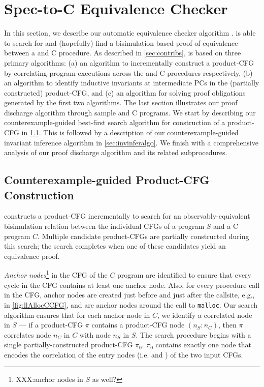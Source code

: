 \section{Spec-to-C Equivalence Checker}
\label{sec:spectocalgo}
In this section, we describe our automatic equivalence checker algorithm \toolName{}.
\toolName{} is able to search for and (hopefully) find a bisimulation based proof of equivalence
between a \SpecL{} and C procedure.
As described in \cref{sec:contribs}, \toolName{} is based on three primary algorithms:
(a) an algorithm to incrementally construct a product-CFG by correlating program executions across
the \SpecL{} and C procedures respectively,
(b) an algorithm to identify inductive invariants at intermediate PCs in the (partially constructed)
product-CFG, and (c) an algorithm for solving proof obligations generated by the first two algorithms.
The last section illustrates our proof discharge algorithm through sample \SpecL{} and C programs.
We start by describing our counterexample-guided best-first search algorithm for
construction of a product-CFG in \cref{sec:searchalgo}.
This is followed by a description of our counterexample-guided invariant inference algorithm in \cref{sec:invinferalgo}.
We finish with a comprehensive analysis of our proof discharge algorithm and its related subprocedures.

\subsection{Counterexample-guided Product-CFG Construction}
\label{sec:searchalgo}
\toolName{} constructs a product-CFG incrementally to search for an observably-equivalent
bisimulation relation between the individual CFGs of a \SpecL{} program $S$ and a C program $C$.
Multiple candidate product-CFGs are partially constructed during this search;
the search completes when one of these candidates yield an equivalence proof.

{\em Anchor nodes}\footnote{XXX:anchor nodes in $S$ as well?} in the CFG of the $C$ program are identified to ensure that every cycle in the CFG
contains at least one anchor node. Also, for every procedure call in the CFG, anchor nodes
are created just before and just after the callsite, e.g., in \cref{fig:llAllocCCFG},  and  are anchor
nodes around the call to {\tt malloc}.
Our search algorithm ensures that for each anchor node in $C$, we identify a correlated node in $S$ --- if
a product-CFG $\pi$ contains a product-CFG node  $(n_S\!:\!n_C)$, then $\pi$
correlates node $n_C$ in $C$ with node $n_S$ in $S$.
The search procedure begins with a single partially-constructed product-CFG $\pi_0$.
$\pi_0$ contains exactly one node  that encodes the correlation of the entry nodes
(i.e.  and ) of the two input CFGs.

